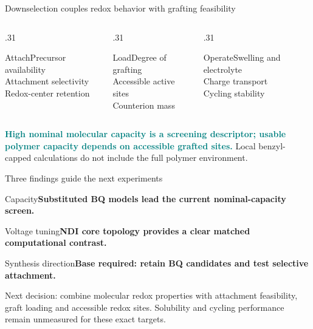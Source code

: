 \begin{frame}{Downselection couples redox behavior with grafting feasibility}
\begin{columns}[T]\begin{column}{.31\textwidth}\begin{block}{Attach}Precursor availability\\[.6em]Attachment selectivity\\[.6em]Redox-center retention\end{block}\end{column}
\begin{column}{.31\textwidth}\begin{block}{Load}Degree of grafting\\[.6em]Accessible active sites\\[.6em]Counterion mass\end{block}\end{column}
\begin{column}{.31\textwidth}\begin{block}{Operate}Swelling and electrolyte\\[.6em]Charge transport\\[.6em]Cycling stability\end{block}\end{column}\end{columns}
\vspace{1em}\textcolor{teal}{\textbf{High nominal molecular capacity is a screening descriptor; usable polymer capacity depends on accessible grafted sites.}}
\vfill\footnotesize Local benzyl-capped calculations do not include the full polymer environment.
\end{frame}
\begin{frame}{Three findings guide the next experiments}
\begin{block}{Capacity}\textbf{Substituted BQ models lead the current nominal-capacity screen.}\end{block}
\begin{block}{Voltage tuning}\textbf{NDI core topology provides a clear matched computational contrast.}\end{block}
\begin{block}{Synthesis direction}\textbf{Base required: retain BQ candidates and test selective attachment.}\end{block}
\vfill\footnotesize Next decision: combine molecular redox properties with attachment feasibility, graft loading and accessible redox sites. Solubility and cycling performance remain unmeasured for these exact targets.
\end{frame}
